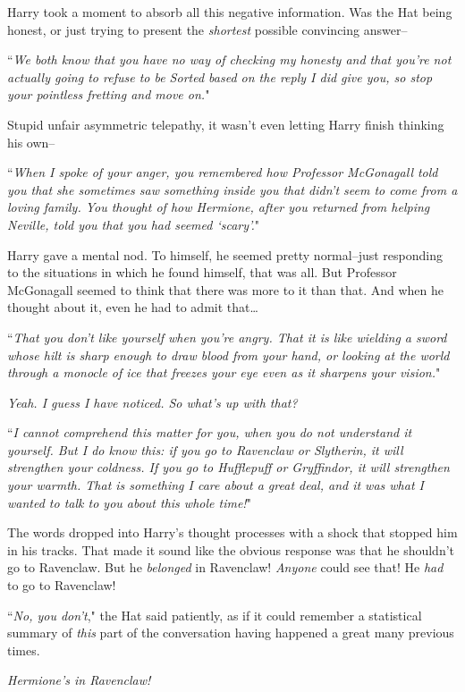 Harry took a moment to absorb all this negative information. Was the Hat being honest, or just trying to present the \emph{shortest} possible convincing answer\---

``\emph{We both know that you have no way of checking my honesty and that you're not actually going to refuse to be Sorted based on the reply I did give you, so stop your pointless fretting and move on.}"

Stupid unfair asymmetric telepathy, it wasn't even letting Harry finish thinking his own\---

``\emph{When I spoke of your anger, you remembered how Professor McGonagall told you that she sometimes saw something inside you that didn't seem to come from a loving family. You thought of how Hermione, after you returned from helping Neville, told you that you had seemed `scary'.}"

Harry gave a mental nod. To himself, he seemed pretty normal\---just responding to the situations in which he found himself, that was all. But Professor McGonagall seemed to think that there was more to it than that. And when he thought about it, even he had to admit that{\ldots}

``\emph{That you don't like yourself when you're angry. That it is like wielding a sword whose hilt is sharp enough to draw blood from your hand, or looking at the world through a monocle of ice that freezes your eye even as it sharpens your vision.}"

\emph{Yeah. I guess I have noticed. So what's up with that?}

``\emph{I cannot comprehend this matter for you, when you do not understand it yourself. But I do know this: if you go to Ravenclaw or Slytherin, it will strengthen your coldness. If you go to Hufflepuff or Gryffindor, it will strengthen your warmth. \emph{That} is something I care about a great deal, and it was what I wanted to talk to you about this whole time!}"

The words dropped into Harry's thought processes with a shock that stopped him in his tracks. That made it sound like the obvious response was that he shouldn't go to Ravenclaw. But he \emph{belonged} in Ravenclaw! \emph{Anyone} could see that! He \emph{had} to go to Ravenclaw!

``\emph{No, you don't}," the Hat said patiently, as if it could remember a statistical summary of \emph{this} part of the conversation having happened a great many previous times.

\emph{Hermione's in Ravenclaw!}

